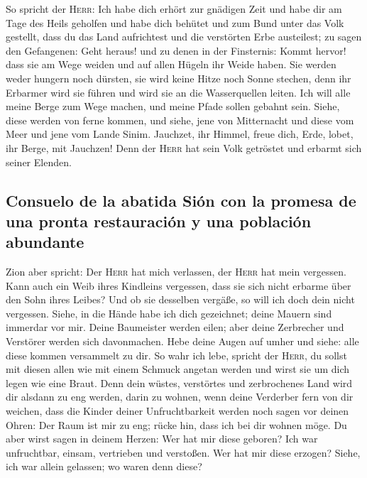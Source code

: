  So spricht der \textsc{Herr}: Ich habe dich erhört zur
gnädigen Zeit und habe dir am Tage des Heils geholfen und habe dich
behütet und zum Bund unter das Volk gestellt, dass du das Land
aufrichtest und die verstörten Erbe austeilest;  zu sagen
den Gefangenen: Geht heraus! und zu denen in der Finsternis: Kommt
hervor! dass sie am Wege weiden und auf allen Hügeln ihr Weide haben.
 Sie werden weder hungern noch dürsten, sie wird keine
Hitze noch Sonne stechen, denn ihr Erbarmer wird sie führen und wird sie
an die Wasserquellen leiten.  Ich will alle meine Berge
zum Wege machen, und meine Pfade sollen gebahnt sein. 
Siehe, diese werden von ferne kommen, und siehe, jene von Mitternacht
und diese vom Meer und jene vom Lande Sinim.  Jauchzet,
ihr Himmel, freue dich, Erde, lobet, ihr Berge, mit Jauchzen! Denn der
\textsc{Herr} hat sein Volk getröstet und erbarmt sich seiner Elenden.

\hypertarget{consuelo-de-la-abatida-siuxf3n-con-la-promesa-de-una-pronta-restauraciuxf3n-y-una-poblaciuxf3n-abundante}{%
\subsection{Consuelo de la abatida Sión con la promesa de una pronta
restauración y una población
abundante}\label{consuelo-de-la-abatida-siuxf3n-con-la-promesa-de-una-pronta-restauraciuxf3n-y-una-poblaciuxf3n-abundante}}

 Zion aber spricht: Der \textsc{Herr} hat mich verlassen,
der \textsc{Herr} hat mein vergessen.  Kann auch ein Weib
ihres Kindleins vergessen, dass sie sich nicht erbarme über den Sohn
ihres Leibes? Und ob sie desselben vergäße, so will ich doch dein nicht
vergessen.  Siehe, in die Hände habe ich dich gezeichnet;
deine Mauern sind immerdar vor mir.  Deine Baumeister
werden eilen; aber deine Zerbrecher und Verstörer werden sich
davonmachen.  Hebe deine Augen auf umher und siehe: alle
diese kommen versammelt zu dir. So wahr ich lebe, spricht der
\textsc{Herr}, du sollst mit diesen allen wie mit einem Schmuck angetan
werden und wirst sie um dich legen wie eine Braut.  Denn
dein wüstes, verstörtes und zerbrochenes Land wird dir alsdann zu eng
werden, darin zu wohnen, wenn deine Verderber fern von dir weichen,
 dass die Kinder deiner Unfruchtbarkeit werden noch sagen
vor deinen Ohren: Der Raum ist mir zu eng; rücke hin, dass ich bei dir
wohnen möge.  Du aber wirst sagen in deinem Herzen: Wer
hat mir diese geboren? Ich war unfruchtbar, einsam, vertrieben und
verstoßen. Wer hat mir diese erzogen? Siehe, ich war allein gelassen; wo
waren denn diese?

